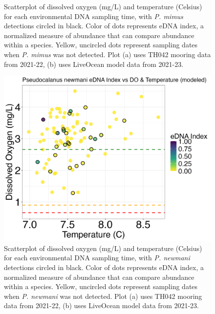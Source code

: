 \documentclass[12pt,twoside]{reedthesis}
\begin{document}
{\begin{figure}[!h]
\begin{center}
			\caption[\textit{P. mimus} scatterplot]{\footnotesize{Scatterplot of dissolved oxygen (mg/L) and temperature (Celsius) for each environmental DNA sampling time, with \textit{P. mimus} detections circled in black. Color of dots represents eDNA index, a normalized measure of abundance that can compare abundance within a species. Yellow, uncircled dots represent sampling dates when \textit{P. mimus} was not detected. Plot (a) uses TH042 mooring data from 2021-22, (b) uses LiveOcean model data from 2021-23.}} %
			\label{PmimusScatter}
			\end{center}
	\end{figure} 
	
	\begin{figure}[!h]
		\begin{center}
			\includegraphics[scale=0.3]{Pnewmani_Scatter_AllYr_mod_noOut}
			\caption[\textit{P. newmani} scatterplot]{\footnotesize{Scatterplot of dissolved oxygen (mg/L) and temperature (Celsius) for each environmental DNA sampling time, with \textit{P. newmani} detections circled in black. Color of dots represents eDNA index, a normalized measure of abundance that can compare abundance within a species. Yellow, uncircled dots represent sampling dates when \textit{P. newmani} was not detected. Plot (a) uses TH042 mooring data from 2021-22, (b) uses LiveOcean model data from 2021-23.}} %
			\label{PnewmaniScatter}
		\end{center}
	\end{figure} 
	
}
\end{document}

